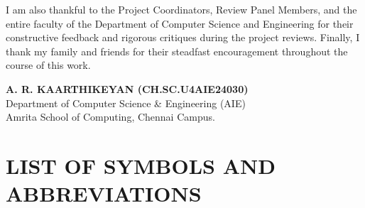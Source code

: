 \documentclass[12pt,a4paper]{report}
\begin{document}
I am also thankful to the Project Coordinators, Review Panel Members, and the entire faculty of the Department of Computer Science and Engineering for their constructive feedback and rigorous critiques during the project reviews. Finally, I thank my family and friends for their steadfast encouragement throughout the course of this work.

\vspace{2.0cm}
\noindent
\textbf{A. R. KAARTHIKEYAN (CH.SC.U4AIE24030)}\\
Department of Computer Science \& Engineering (AIE)\\
Amrita School of Computing, Chennai Campus.

\newpage
\tableofcontents

\newpage
\listoffigures

\newpage
\listoftables

\newpage
\chapter*{LIST OF SYMBOLS AND ABBREVIATIONS}
\end{document}
